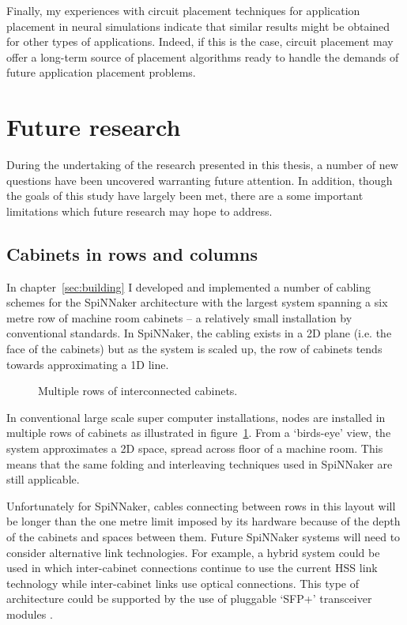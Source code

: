 		Finally, my experiences with circuit placement techniques for application
		placement in neural simulations indicate that similar results might be
		obtained for other types of applications. Indeed, if this is the case,
		circuit placement may offer a long-term source of placement algorithms
		ready to handle the demands of future application placement problems.
		
	\section{Future research}
		
		During the undertaking of the research presented in this thesis, a number
		of new questions have been uncovered warranting future attention. In
		addition, though the goals of this study have largely been met, there are a
		some important limitations which future research may hope to address.
		
		\subsection{Cabinets in rows and columns}
			
			In chapter~\ref{sec:building} I developed and implemented a number of
			cabling schemes for the SpiNNaker architecture with the largest system
			spanning a six metre row of machine room cabinets -- a relatively small
			installation by conventional standards. In SpiNNaker, the cabling exists
			in a 2D plane (i.e. the face of the cabinets) but as the system is scaled
			up, the row of cabinets tends towards approximating a 1D line.
			
			\begin{figure}
				\center
				
				\caption{Multiple rows of interconnected cabinets.}
				\label{fig:multi-row-cabling}
			\end{figure}
			
			In conventional large scale super computer installations, nodes are
			installed in multiple rows of cabinets as illustrated in
			figure~\ref{fig:multi-row-cabling}.  From a `birds-eye' view, the system
			approximates a 2D space, spread across floor of a machine room. This
			means that the same folding and interleaving techniques used in SpiNNaker
			are still applicable.
			
			Unfortunately for SpiNNaker, cables connecting between rows in this
			layout will be longer than the one metre limit imposed by its hardware
			because of the depth of the cabinets and spaces between them. Future
			SpiNNaker systems will need to consider alternative link technologies.
			For example, a hybrid system could be used in which inter-cabinet
			connections continue to use the current HSS link technology while
			inter-cabinet links use optical connections. This type of architecture
			could be supported by the use of pluggable `SFP+' transceiver modules
			\cite{sff01}.
		
